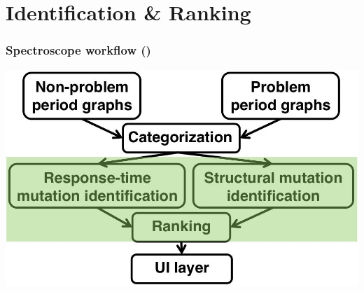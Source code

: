 \documentclass[11pt]{beamer}
\begin{document}
\section{Identification \& Ranking}
\begin{frame}
\frametitle{Spectroscope workflow ()}
\includegraphics[width=\textwidth]{res/work3.jpg}
\end{frame}
\end{document}
